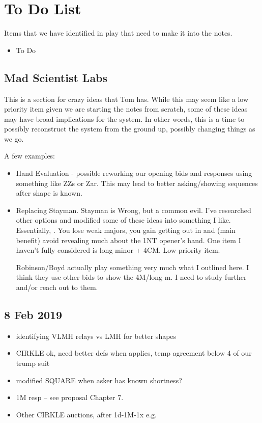 \documentclass[tom-ari]{subfile}
\begin{document}
	
	\chapter{To Do List}
	
	Items that we have identified in play that need to make it into the notes.
	\begin{itemize}
		\item To Do
	\end{itemize}

	\section{Mad Scientist Labs}
	
	This is a section for crazy ideas that Tom has.  While this may seem like a low priority item given we are starting the notes from scratch, some of these ideas may have broad implications for the system.  In other words, this is a time to possibly reconstruct the system from the ground up, possibly changing things as we go.
	
	A few examples:
	
	\begin{itemize}
		\item Hand Evaluation - possible reworking our opening bids and responses using something like ZZs or Zar.  This may lead to better asking/showing sequences after shape is known.
		\item Replacing Stayman.  Stayman is Wrong, but a common evil.  I've researched other options and modified some of these ideas into something I like.  Essentially, \rightarrow{}.  You lose weak majors, you gain getting out in  and (main benefit) avoid revealing much about the 1NT opener's hand.  One item I haven't fully considered is long minor + 4CM.  Low priority item.
		
		 Robinson/Boyd actually play something very much what I outlined here.  I think they use other bids to show the 4M/long m.  I need to study further and/or reach out to them.
	\end{itemize}

	\section{8 Feb 2019}
	\begin{itemize}
		\item identifying VLMH relays vs LMH for better shapes
		\item CIRKLE ok, need better defs when applies, temp agreement below 4 of our trump suit
		\item modified SQUARE when asker has known shortness? 
		\item 1M resp -- see proposal Chapter 7. 
		\item Other CIRKLE auctions, after 1d-1M-1x e.g.
	\end{itemize}
\end{document}
